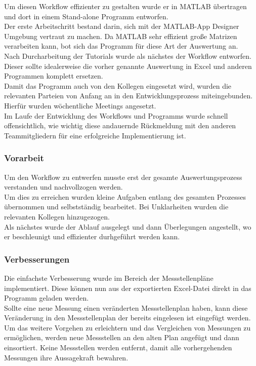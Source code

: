 Um diesen Workflow effizienter zu gestalten wurde er in MATLAB übertragen und dort in einem Stand-alone Programm entworfen. \\

Der erste Arbeitschritt bestand darin, sich mit der MATLAB-App Designer Umgebung vertraut zu machen. Da MATLAB sehr effizient große Matrizen verarbeiten kann, bot sich das Programm für diese Art der Auswertung an. \\
Nach Durcharbeitung der Tutorials wurde als nächstes der Workflow entworfen. \\
Dieser sollte idealerweise die vorher genannte Auswertung in Excel und anderen Programmen komplett ersetzen. \\
Damit das Programm auch von den Kollegen eingesetzt wird, wurden die relevanten Parteien von Anfang an in den Entwicklungsprozess miteingebunden. Hierfür wurden wöchentliche Meetings angesetzt.\\
Im Laufe der Entwicklung des Workflows und Programms wurde schnell offensichtlich, wie wichtig diese andauernde Rückmeldung mit den anderen Teammitgliedern für eine erfolgreiche Implementierung ist.\\

\subsubsection{Vorarbeit}

Um den Workflow zu entwerfen musste erst der gesamte Auswertungsprozess verstanden und nachvollzogen werden. \\
Um dies zu erreichen wurden kleine Aufgaben entlang des gesamten Prozesses übernommen und selbstständig bearbeitet. Bei Unklarheiten wurden die relevanten Kollegen hinzugezogen.\\

Als nächstes wurde der Ablauf ausgelegt und dann Überlegungen angestellt, wo er beschleunigt und effizienter durhgeführt werden kann.

\subsubsection{Verbesserungen}

Die einfachste Verbesserung wurde im Bereich der Messstellenpläne implementiert. Diese können nun aus der exportierten Excel-Datei direkt in das Programm geladen werden. \\
Sollte eine neue Messung einen veränderten Messstellenplan haben, kann diese Veränderung in den Messstellenplan der bereits eingelesen ist eingefügt werden.\\
Um das weitere Vorgehen zu erleichtern und das Vergleichen von Messungen zu ermöglichen, werden neue Messstellen an den alten Plan angefügt und dann einsortiert. Keine Messstellen werden entfernt, damit alle vorhergehenden Messungen ihre Aussagekraft bewahren.\\

